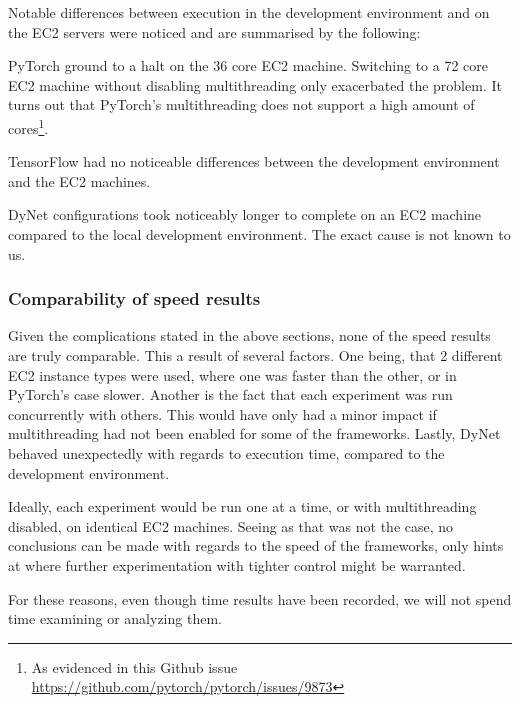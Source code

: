 Notable differences between execution in the development environment and on the
EC2 servers were noticed and are summarised by the following:

PyTorch ground to a halt on the 36 core EC2 machine. Switching to a 72 core EC2
machine without disabling multithreading only exacerbated the problem. It turns
out that PyTorch's multithreading does not support a high amount of
cores\footnote{As evidenced in this Github issue \url{https://github.com/pytorch/pytorch/issues/9873}}.

TensorFlow had no noticeable differences between the development environment and
the EC2 machines.

DyNet configurations took noticeably longer to complete on an
EC2 machine compared to the local development environment. The exact cause is
not known to us.

\subsubsection{Comparability of speed results}

Given the complications stated in the above sections, none of the speed results
are truly comparable. This a result of several factors. One being, that 2
different EC2 instance types were used, where one was faster than the other, or
in PyTorch's case slower. Another is the fact that each experiment was run
concurrently with others. This would have only had a minor impact if
multithreading had not been enabled for some of the frameworks. Lastly, DyNet
behaved unexpectedly with regards to execution time, compared to the development
environment.

Ideally, each experiment would be run one at a time, or with multithreading
disabled, on identical EC2 machines. Seeing as that was not the case, no
conclusions can be made with regards to the speed of the frameworks, only hints
at where further experimentation with tighter control might be warranted.

For these reasons, even though time results have been recorded, we will not
spend time examining or analyzing them.
